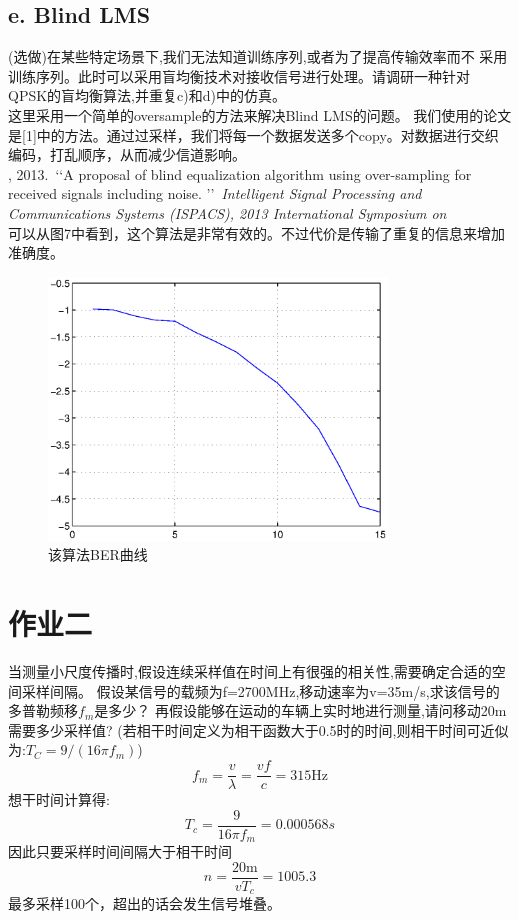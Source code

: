 \documentclass{article}
\begin{document}
\subsection*{e. Blind LMS}
 (选做)在某些特定场景下,我们无法知道训练序列,或者为了提高传输效率而不
采用训练序列。此时可以采用盲均衡技术对接收信号进行处理。请调研一种针对
QPSK的盲均衡算法,并重复c)和d)中的仿真。\\
这里采用一个简单的oversample的方法来解决Blind LMS的问题。
我们使用的论文是[1]中的方法。通过过采样，我们将每一个数据发送多个copy。对数据进行交织编码，打乱顺序，从而减少信道影响。\\
, 2013.\ \lq \lq A proposal of blind equalization algorithm using over-sampling for received signals including noise. \rq \rq\ \emph{Intelligent Signal Processing and Communications Systems (ISPACS), 2013 International Symposium on}\\
可以从图7中看到，这个算法是非常有效的。不过代价是传输了重复的信息来增加准确度。
\begin{figure}[t!]
\centering
\includegraphics[width=9cm]{9.eps}
\caption{该算法BER曲线}
\end{figure}
\section{作业二}
当测量小尺度传播时,假设连续采样值在时间上有很强的相关性,需要确定合适的空间采样间隔。
假设某信号的载频为f=2700MHz,移动速率为v=35m/s,求该信号的多普勒频移\(f_m\)是多少？
再假设能够在运动的车辆上实时地进行测量,请问移动20m需要多少采样值?
(若相干时间定义为相干函数大于0.5时的时间,则相干时间可近似为:\(T_C = 9/(16\pi f_m)\))\\
\begin{equation}
	f_m = \frac{v}{\lambda} = \frac{vf}{c} = 315\mbox{Hz}
\end{equation}
想干时间计算得:
\begin{equation}
T_c = \frac{9}{16\pi f_m} = 0.000568s
\end{equation}
因此只要采样时间间隔大于相干时间
\begin{equation}
n = \frac{20\mbox{m}}{vT_c} = 1005.3
\end{equation}
最多采样100个，超出的话会发生信号堆叠。
\end{document}
